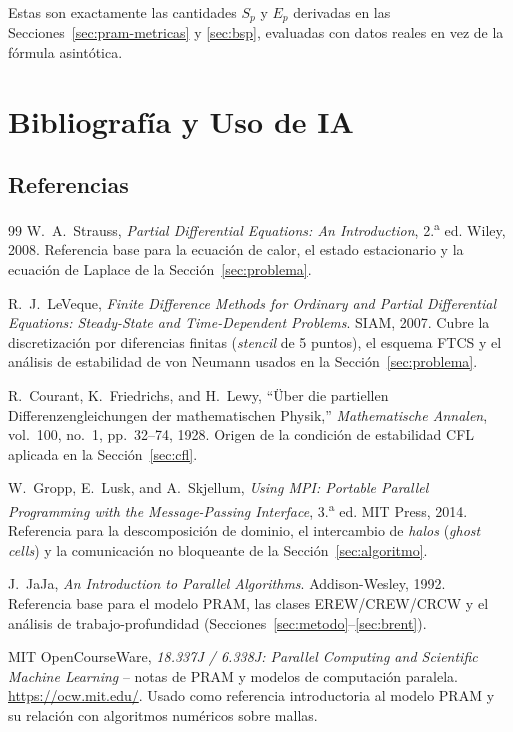 \documentclass[11pt,a4paper]{article}
\begin{document}
	Estas son exactamente las cantidades $S_p$ y $E_p$ derivadas en las
	Secciones~\ref{sec:pram-metricas} y \ref{sec:bsp}, evaluadas con datos reales en
	vez de la fórmula asintótica.

	\section{Bibliografía y Uso de IA}
	\label{sec:biblio}

	\subsection{Referencias}

	\begin{thebibliography}{99}
	\enlargethispage{4 \baselineskip}
	W.\ A.\ Strauss, \textit{Partial Differential Equations: An Introduction},
	2.\textsuperscript{a} ed. Wiley, 2008. Referencia base para la ecuación de calor,
	el estado estacionario y la ecuación de Laplace de la
	Sección~\ref{sec:problema}.

	R.\ J.\ LeVeque, \textit{Finite Difference Methods for Ordinary and Partial
	Differential Equations: Steady-State and Time-Dependent Problems}. SIAM, 2007.
	Cubre la discretización por diferencias finitas (\textit{stencil} de 5 puntos),
	el esquema FTCS y el análisis de estabilidad de von Neumann usados en la
	Sección~\ref{sec:problema}.

	R.\ Courant, K.\ Friedrichs, and H.\ Lewy, ``Über die partiellen
	Differenzengleichungen der mathematischen Physik,'' \textit{Mathematische
	Annalen}, vol.\ 100, no.\ 1, pp.\ 32--74, 1928. Origen de la condición de
	estabilidad CFL aplicada en la Sección~\ref{sec:cfl}.

	W.\ Gropp, E.\ Lusk, and A.\ Skjellum, \textit{Using MPI: Portable Parallel
	Programming with the Message-Passing Interface}, 3.\textsuperscript{a} ed. MIT
	Press, 2014. Referencia para la descomposición de dominio, el intercambio de
	\textit{halos} (\textit{ghost cells}) y la comunicación no bloqueante de la
	Sección~\ref{sec:algoritmo}.

	J.\ JaJa, \textit{An Introduction to Parallel Algorithms}. Addison-Wesley, 1992.
	Referencia base para el modelo PRAM, las clases EREW/CREW/CRCW y el análisis de
	trabajo-profundidad (Secciones~\ref{sec:metodo}--\ref{sec:brent}).

	MIT OpenCourseWare, \textit{18.337J / 6.338J: Parallel Computing and Scientific
	Machine Learning} -- notas de PRAM y modelos de computación paralela.
	\url{https://ocw.mit.edu/}. Usado como referencia introductoria al modelo PRAM y
	su relación con algoritmos numéricos sobre mallas.


\end{thebibliography}
\end{document}
